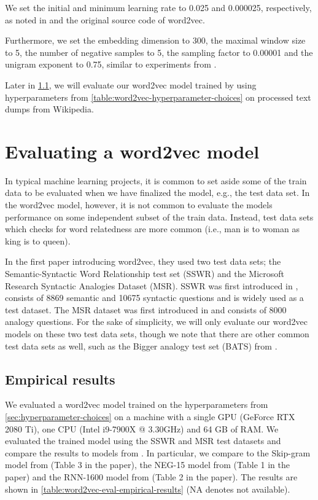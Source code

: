 We set the initial and minimum learning rate to 0.025 and 0.000025, respectively, as noted in \cite{mikolov2013a} and the original source code of word2vec.

Furthermore, we set the embedding dimension to 300, the maximal window size to 5, the number of negative samples to 5, the sampling factor to 0.00001 and the unigram exponent to 0.75, similar to experiments from \cite{mikolov2013b}.

Later in \cref{sec:word2vec-eval-empirical-results}, we will evaluate our word2vec model trained by using hyperparameters from \cref{table:word2vec-hyperparameter-choices} on processed text dumps from Wikipedia.

\section{Evaluating a word2vec model}
\label{sec:eval-word2vec-model}
In typical machine learning projects, it is common to set aside some of the train data to be evaluated when we have finalized the model, e.g., the test data set. In the word2vec model, however, it is not common to evaluate the models performance on some independent subset of the train data. Instead, test data sets which checks for word relatedness are more common (i.e., man is to woman as king is to queen).

In the first paper introducing word2vec, they used two test data sets; the Semantic-Syntactic Word Relationship test set (SSWR) and the Microsoft Research Syntactic Analogies Dataset (MSR). SSWR was first introduced in \cite{mikolov2013a}, consists of 8869 semantic and 10675 syntactic questions and is widely used as a test dataset. The MSR dataset was first introduced in \cite{mikolov-etal-2013-linguistic} and consists of 8000 analogy questions. For the sake of simplicity, we will only evaluate our word2vec models on these two test data sets, though we note that there are other common test data sets as well, such as the Bigger analogy test set (BATS) from \cite{gladkova-etal-2016-analogy}.

\subsection{Empirical results}
\label{sec:word2vec-eval-empirical-results}
We evaluated a word2vec model trained on the hyperparameters from \cref{sec:hyperparameter-choices} on a machine with a single GPU (GeForce RTX 2080 Ti), one CPU (Intel i9-7900X @ 3.30GHz) and 64 GB of RAM. We evaluated the trained model using the SSWR and MSR test datasets and compare the results to models from \cite{mikolov2013a, mikolov2013b, mikolov-etal-2013-linguistic}. In particular, we compare to the Skip-gram model from \cite{mikolov2013a} (Table 3 in the paper), the NEG-15 model from \cite{mikolov2013b} (Table 1 in the paper) and the RNN-1600 model from \cite{mikolov-etal-2013-linguistic} (Table 2 in the paper). The results are shown in \cref{table:word2vec-eval-empirical-results} (NA denotes not available).

